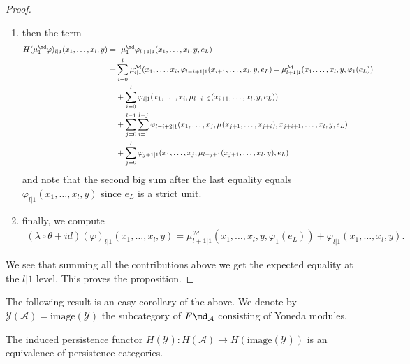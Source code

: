 \begin{proof}
\begin{enumerate}
\begin{align*}
		\end{align*}
		\item then the term \begin{align*}
			H(\mu_1^{\md}\varphi)_{l|1}(x_1,\ldots, x_l,y)  =& \ \   \mu_1^{\md}\varphi_{l+1|1}(x_1,\ldots, x_l,y,e_L) \\  =&   \sum_{i=0}^l \mu^\mathcal{M}_{i|1}(x_1,\ldots, x_i, \varphi_{l-i+1|1}(x_{i+1},\ldots, x_l,y,e_L) + \mu_{l+1|1}^\mathcal{M}(x_1,\ldots, x_l,y,\varphi_1(e_L))\\ & +\sum_{i=0}^l \varphi_{i|1}(x_1,\ldots, x_i, \mu_{l-i+2}(x_{i+1},\ldots, x_l,y,e_L))
			\\ & + \sum_{j=0}^{l-1}\sum_{i=1}^{l-j} \varphi_{l-i+2|1}(x_1,\ldots, x_j, \mu_{}(x_{j+1},\ldots, x_{j+i}),x_{j+i+1},\ldots, x_l,y,e_L) \\ & + \sum_{j=0}^l \varphi_{j+1|1}(x_1,\ldots, x_j, \mu_{l-j+1}(x_{j+1},\ldots, x_l,y),e_L)
		\end{align*}
		and note that the second big sum after the last equality equals $\varphi_{l|1}(x_1,\ldots, x_l,y)$ since $e_L$ is a strict unit.
		\item finally, we compute \begin{align}
			(\lambda\circ \theta + id)(\varphi)_{l|1}(x_1,\ldots, x_l,y) = \mu_{l+1|1}^\mathcal{M}(x_1,\ldots, x_l,y,\varphi_1(e_L)) + \varphi_{l|1}(x_1,\ldots, x_l,y).
		\end{align}
		
	\end{enumerate}
	We see that summing all the contributions above we get the expected equality at the $l|1$ level. This proves the proposition.
\end{proof}
The following result is an easy corollary of the above. We denote by $\mathcal{Y}(\mathcal{A})=\text{image}(\mathcal{Y})$ the subcategory of $F\md_\mathcal{A}$ consisting of Yoneda modules.
\begin{cor}
	The induced persistence functor $H(\mathcal{Y})\colon H(\mathcal{A})\to H(\text{image}(\mathcal{Y}))$ is an equivalence of persistence categories.
\end{cor}

